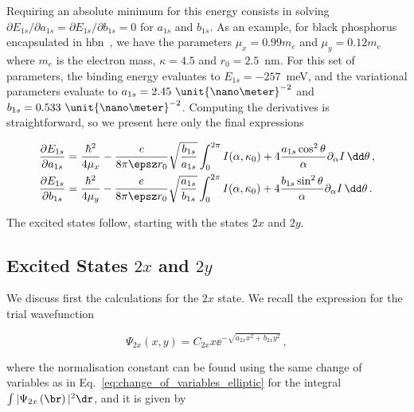 Requiring an absolute minimum for this energy consists in solving $\partial E_{1s}/\partial a_{1s}=\partial E_{1s}/\partial b_{1s}=0$ for $a_{1s}$ and $b_{1s}$.
As an example, for black phosphorus encapsulated in \gls{hbn}~\cite{Gomes_Trallero-Giner_Vasilevskiy_2021}, we have the parameters $\mu_{x}=0.99m_{e}$ and $\mu_{y}=0.12m_{e}$ where $m_e$ is the electron mass, $\kappa=4.5$ and $r_{0}=2.5$~\unit{\nano\meter}.
For this set of parameters, the binding energy evaluates to $E_{1s}=-257$~\unit{\milli\electronvolt}, and the variational parameters evaluate to $a_{1s}=2.45\text{ \unit{\nano\meter}}^{-2}$ and
$b_{1s}=0.533\text{ \unit{\nano\meter}}^{-2}$.
Computing the derivatives is straightforward, so we present here only the final expressions

\begin{subequations}
    \begin{align}
        \frac{\partial E_{1s}}{\partial a_{1s}}  &= \frac{\hbar^2}{4 \mu_x} - \frac{e}{8 \pi \epsz r_0} \sqrt{\frac{b_{1s}}{a_{1s}}} \int_0^{2 \pi} I(\alpha,\kappa_0) + 4 \frac{a_{1s} \cos^2 \theta}{\alpha} \partial_\alpha I \,\dd \theta\,, \\
        \frac{\partial E_{1s}}{\partial b_{1s}}  &= \frac{\hbar^2}{4 \mu_y} - \frac{e}{8 \pi \epsz r_0} \sqrt{\frac{a_{1s}}{b_{1s}}} \int_0^{2 \pi} I(\alpha,\kappa_0) + 4 \frac{b_{1s} \sin^2 \theta}{\alpha} \partial_\alpha I \,\dd \theta\,.
    \end{align}
\end{subequations}

\noindent The excited states follow, starting with the states $2x$ and $2y$.

\subsection{Excited States $2x$ and $2y$}
\label{subsec:excited_states_2x_2y}

We discuss first the calculations for the $2x$ state.
We recall the expression for the trial wavefunction

\begin{equation}
    \label{eq:2x_trial_wavefunction}
    \Psi_{2x}(x,y)=C_{2x}x \ee^{-\sqrt{a_{2x}x^{2}+b_{2x}y^{2}}}\,,
\end{equation}

\noindent where the normalisation constant can be found using the same change of variables as in Eq.~\eqref{eq:change_of_variables_elliptic} for the integral $\int |\Psi_{2x}\left(\br\right)|^2 \dr $, and it is given by

